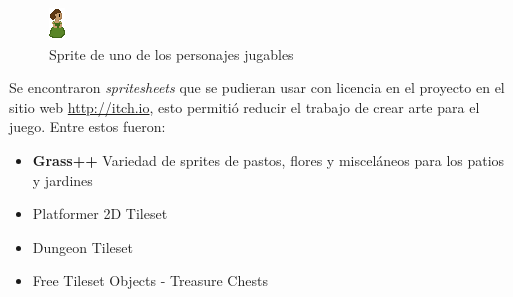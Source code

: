 \begin{figure}
    \centering
    \includegraphics[width=0.25\linewidth]{images/JohannaOrdonez.png}
    \caption{Sprite de uno de los personajes jugables}
    \label{fig:sprite_johanna}
\end{figure}

Se encontraron \textit{spritesheets} que se pudieran usar con licencia en el proyecto en el sitio web \url{http://itch.io}, esto permitió reducir el trabajo de crear arte para el juego.
Entre estos fueron:
\begin{itemize}
    \item \textbf{Grass++} Variedad de sprites de pastos, flores y misceláneos para los patios y jardines
    \item Platformer 2D Tileset
    \item Dungeon Tileset
    \item Free Tileset Objects - Treasure Chests
\end{itemize}

